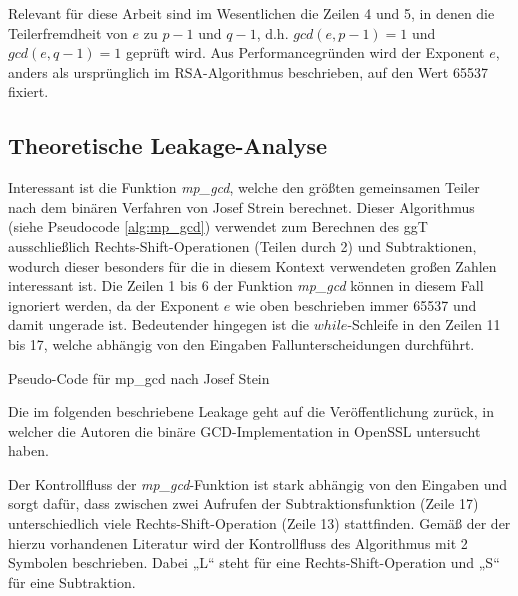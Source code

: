 Relevant für diese Arbeit sind im Wesentlichen die Zeilen 4 und 5, in denen die Teilerfremdheit von $e$ zu $p-1$ und $q-1$, d.h. $gcd(e,p-1) = 1$ und $gcd(e,q-1) = 1$ geprüft wird.
Aus Performancegründen wird der Exponent $e$, anders als ursprünglich im RSA-Algorithmus beschrieben, auf den Wert 65537 fixiert.

\subsection{Theoretische Leakage-Analyse}
\label{TheoLeakageAna}

Interessant ist die Funktion \textit{mp_gcd}, welche den größten gemeinsamen Teiler nach dem binären Verfahren von Josef Strein \cite{SteinBinaryGCD} berechnet. 
Dieser Algorithmus (siehe Pseudocode \ref{alg:mp_gcd}) verwendet zum Berechnen des ggT ausschließlich Rechts-Shift-Operationen (Teilen durch 2) und Subtraktionen, wodurch dieser besonders für die in diesem Kontext verwendeten großen Zahlen interessant ist.
Die Zeilen 1 bis 6 der Funktion \textit{mp_gcd} können in diesem Fall ignoriert werden, da der Exponent $e$ wie oben beschrieben immer 65537 und damit ungerade ist. 
Bedeutender hingegen ist die $while$-Schleife in den Zeilen 11 bis 17, welche abhängig von den Eingaben Fallunterscheidungen durchführt. 

\begin{algorithm}[h]
\DontPrintSemicolon
\caption{Pseudo-Code für mp_gcd nach Josef Stein}
\label{alg:mp_gcd}

\end{algorithm}

Die im folgenden beschriebene Leakage geht auf die Veröffentlichung \cite{RSAKeyGeneration2} zurück, in welcher die Autoren die binäre GCD-Implementation in OpenSSL untersucht haben.

Der Kontrollfluss der \textit{mp_gcd}-Funktion ist stark abhängig von den Eingaben und sorgt dafür, dass zwischen zwei Aufrufen der Subtraktionsfunktion (Zeile 17) unterschiedlich viele Rechts-Shift-Operation (Zeile 13) stattfinden.
Gemäß der der hierzu vorhandenen Literatur \cite{ShiftSubtractionDescription} wird der Kontrollfluss des Algorithmus mit 2 Symbolen beschrieben.
Dabei „L“ steht für eine Rechts-Shift-Operation und „S“ für eine Subtraktion.

